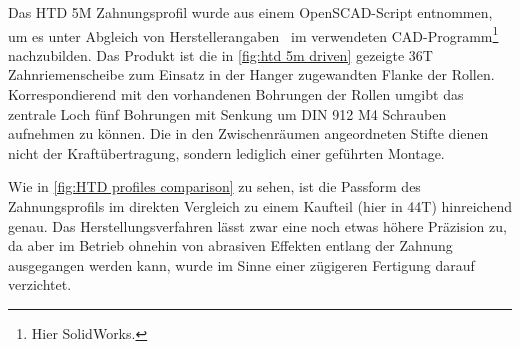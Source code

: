 		Das HTD 5M Zahnungsprofil wurde aus einem OpenSCAD-Script\cite{thingiverse.tooth.profiles.2012} entnommen, um es unter Abgleich von Herstellerangaben~\cite{gates.catalogue.2021,GatesCorporation.drive.design.manual.2014} im verwendeten CAD-Programm\footnote{\hspace{1mm} Hier SolidWorks.} nachzubilden.
		Das Produkt ist die in \cref{fig:htd 5m driven} gezeigte 36T Zahnriemenscheibe zum Einsatz in der Hanger zugewandten Flanke der Rollen.
		Korrespondierend mit den vorhandenen Bohrungen der Rollen umgibt das zentrale Loch fünf Bohrungen mit Senkung um DIN 912 M4 Schrauben aufnehmen zu können.
		Die in den Zwischenräumen angeordneten Stifte dienen nicht der Kraftübertragung, sondern lediglich einer geführten Montage.
		
		Wie in \cref{fig:HTD profiles comparison} zu sehen, ist die Passform des Zahnungsprofils im direkten Vergleich zu einem Kaufteil (hier in 44T) hinreichend genau.
		Das Herstellungsverfahren lässt zwar eine noch etwas höhere Präzision zu, da aber im Betrieb ohnehin von abrasiven Effekten entlang der Zahnung ausgegangen werden kann, wurde im Sinne einer zügigeren Fertigung darauf verzichtet.
